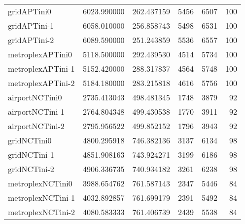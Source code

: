 \begin{longtable}{lrrrrr}
gridAPTini0 & 6023.990000 & 262.437159 & 5456 & 6507 & 100 \\
gridAPTini-1 & 6058.010000 & 256.858743 & 5498 & 6531 & 100 \\
gridAPTini-2 & 6089.590000 & 251.243859 & 5536 & 6557 & 100 \\
metroplexAPTini0 & 5118.500000 & 292.439530 & 4514 & 5734 & 100 \\
metroplexAPTini-1 & 5152.420000 & 288.317837 & 4564 & 5748 & 100 \\
metroplexAPTini-2 & 5184.180000 & 283.215818 & 4616 & 5756 & 100 \\
airportNCTini0 & 2735.413043 & 498.481345 & 1748 & 3879 & 92 \\
airportNCTini-1 & 2764.804348 & 499.430538 & 1770 & 3911 & 92 \\
airportNCTini-2 & 2795.956522 & 499.852152 & 1796 & 3943 & 92 \\
gridNCTini0 & 4800.295918 & 746.382136 & 3137 & 6134 & 98 \\
gridNCTini-1 & 4851.908163 & 743.924271 & 3199 & 6186 & 98 \\
gridNCTini-2 & 4906.336735 & 740.934182 & 3261 & 6238 & 98 \\
metroplexNCTini0 & 3988.654762 & 761.587143 & 2347 & 5446 & 84 \\
metroplexNCTini-1 & 4032.892857 & 761.699179 & 2391 & 5492 & 84 \\
metroplexNCTini-2 & 4080.583333 & 761.406739 & 2439 & 5538 & 84 \\
\end{longtable}
